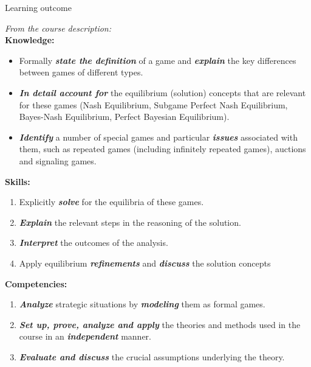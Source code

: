 \begin{frame}{Learning outcome}
\begin{multicols}{2}
  \color{lightgray}
  \textit{From the course description:}
  \\\medskip
  \textbf{Knowledge:}
  \begin{itemize}\color{lightgray}
    \item[\textcolor{lightgray}{1.}] Formally \textit{\textbf{state the definition}} of a game and \textit{\textbf{explain}} the key differences between games of different types.
    \item[\textcolor{lightgray}{2.}] \textit{\textbf{In detail account for}} the equilibrium (solution) concepts that are relevant for these games (Nash Equilibrium, Subgame Perfect Nash Equilibrium, Bayes-Nash Equilibrium, Perfect Bayesian Equilibrium).
    \item[\textcolor{lightgray}{3.}] \textit{\textbf{Identify}} a number of special games and particular \textit{\textbf{issues}} associated with them, such as repeated games (including infinitely repeated games), auctions and signaling games.
  \end{itemize}
\vfill\null \columnbreak \color{black}
\textbf{Skills:}
\begin{enumerate}
  \item Explicitly \textit{\textbf{solve}} for the equilibria of these games.
  \item \textit{\textbf{Explain}} the relevant steps in the reasoning of the solution.
  \item \textit{\textbf{Interpret}} the outcomes of the analysis.
  \item Apply equilibrium \textit{\textbf{refinements}} and \textit{\textbf{discuss}} the solution concepts
\end{enumerate}
\textbf{Competencies:}
\begin{enumerate}
  \item \textit{\textbf{Analyze}} strategic situations by \textit{\textbf{modeling}} them as formal games.
  \item \textit{\textbf{Set up, prove, analyze and apply}} the theories and methods used in the course in an \textit{\textbf{independent}} manner.
  \item \textit{\textbf{Evaluate and discuss}} the crucial assumptions underlying the theory.
\end{enumerate}
\end{multicols}
\end{frame}


